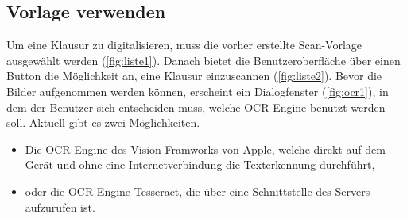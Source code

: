 \documentclass[notables, nomenclature, oneside, 150]{HSMW-Thesis}
\begin{document}
		\subsection{Vorlage verwenden}
			Um eine Klausur zu digitalisieren, muss die vorher erstellte Scan-Vorlage ausgewählt werden (\ref{fig:liste1}). Danach bietet die Benutzeroberfläche über einen Button die Möglichkeit an, eine Klausur einzuscannen (\ref{fig:liste2}). Bevor die Bilder aufgenommen werden können, erscheint ein Dialogfenster (\ref{fig:ocr1}), in dem der Benutzer sich entscheiden muss, welche OCR-Engine benutzt werden soll. Aktuell gibt es zwei Möglichkeiten.
			\begin{itemize}
				\item Die OCR-Engine des Vision Framworks von Apple, welche direkt auf dem Gerät und ohne eine Internetverbindung die Texterkennung durchführt,  
				\item oder die OCR-Engine Tesseract, die über eine Schnittstelle des Servers aufzurufen ist.
			\end{itemize}
				
\end{document}
